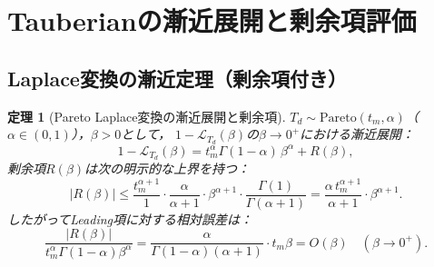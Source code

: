 \documentclass[12pt,a4paper]{article}
\theoremstyle{plain}
\newtheorem{theorem}{定理}[section]
\theoremstyle{definition}
\theoremstyle{remark}
\newcommand{\calL}{\mathcal{L}}
\begin{document}
\section{Tauberianの漸近展開と剰余項評価}
\label{sec:tauberian}

\subsection{Laplace変換の漸近定理（剰余項付き）}

\begin{theorem}[Pareto Laplace変換の漸近展開と剰余項]\label{thm:remainder}
$T_d\sim\mathrm{Pareto}(t_m,\alpha)$（$\alpha\in(0,1)$），$\beta>0$として，
$1-\calL_{T_d}(\beta)$の$\beta\to0^+$における漸近展開：
\begin{equation}\label{eq:tauber_asymp}
  1-\calL_{T_d}(\beta)
  = t_m^\alpha\Gamma(1-\alpha)\,\beta^\alpha + R(\beta),
\end{equation}
剰余項$R(\beta)$は次の明示的な上界を持つ：
\begin{equation}\label{eq:remainder_bound}
  |R(\beta)| \le \frac{t_m^{\alpha+1}}{1}\cdot\frac{\alpha}{\alpha+1}\cdot\beta^{\alpha+1}
  \cdot\frac{\Gamma(1)}{\Gamma(\alpha+1)}
  = \frac{\alpha\,t_m^{\alpha+1}}{\alpha+1}\cdot\beta^{\alpha+1}.
\end{equation}
したがってLeading項に対する相対誤差は：
\begin{equation}\label{eq:relative_error}
  \frac{|R(\beta)|}{t_m^\alpha\Gamma(1-\alpha)\beta^\alpha}
  = \frac{\alpha}{\Gamma(1-\alpha)(\alpha+1)}\cdot t_m\beta
  = O(\beta)
  \quad(\beta\to0^+).
\end{equation}
\end{theorem}
\end{document}
